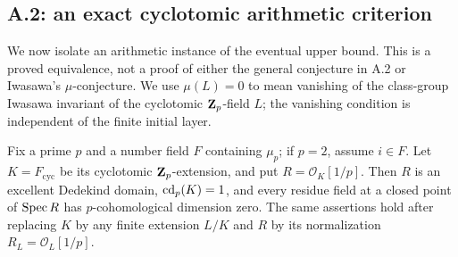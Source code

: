 \subsection{A.2: an exact cyclotomic arithmetic criterion}

We now isolate an arithmetic instance of the eventual upper bound. This is
a proved equivalence, not a proof of either the general conjecture in A.2
or Iwasawa's $\mu$-conjecture. We use $\mu(L)=0$ to mean vanishing of the
class-group Iwasawa invariant of the cyclotomic $\mathbf Z_p$-field $L$; the
vanishing condition is independent of the finite initial layer.

\begin{lemma}
\label{A:cyclotomic-domain}
Fix a prime $p$ and a number field $F$ containing $\mu_p$; if $p=2$,
assume $i\in F$. Let $K=F_{\mathrm{cyc}}$ be its cyclotomic
$\mathbf Z_p$-extension, and put $R=\mathcal O_K[1/p]$. Then $R$ is an excellent
Dedekind domain, $\operatorname{cd}_p(K)=1$, and every residue field at a closed point
of $\operatorname{Spec} R$ has $p$-cohomological dimension zero. The same assertions
hold after replacing $K$ by any finite extension $L/K$ and $R$ by its
normalization $R_L=\mathcal O_L[1/p]$.
\end{lemma}
